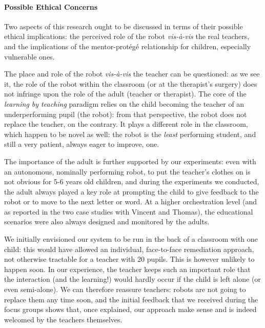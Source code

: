 \documentclass{article}
\begin{document}
\paragraph{Possible Ethical Concerns} Two aspects of this research ought to be
discussed in terms of their possible ethical implications: the perceived role of
the robot \textit{vis-à-vis} the real teachers, and the implications of the
mentor-protégé relationship for children, especially vulnerable ones.

The place and role of the robot \textit{vis-à-vis} the teacher can be
questioned: as we see it, the role of the robot within the classroom (or at the
therapist's surgery) does not infringe upon the role of the adult (teacher or
therapist). The core of the \emph{learning by teaching} paradigm relies on the
child becoming the teacher of an underperforming pupil (the robot): from that
perspective, the robot does not replace the teacher, on the contrary. It plays a
different role in the classroom, which happen to be novel as well: the robot is
the \emph{least} performing student, and still a very patient, always eager to
improve, one.

The importance of the adult is further supported by our experiments: even with
an autonomous, nominally performing robot, to put the teacher's clothes on is
not obvious for 5-6 years old children, and during the experiments we conducted,
the adult always played a key role at prompting the child to give feedback to
the robot or to move to the next letter or word.  At a higher orchestration
level (and as reported in the two case studies with Vincent and Thomas), the
educational scenarios were also always designed and monitored by the adults.

We initially envisioned our system to be run in the back of a classroom with one
child: this would have allowed an individual, face-to-face remediation approach,
not otherwise tractable for a teacher with 20 pupils.  This is however unlikely
to happen soon. In our experience, the teacher keeps such an important role that
the interaction (and the learning!) would hardly occur if the child is left
alone (or even semi-alone). We can therefore reassure teachers: robots are not
going to replace them any time soon, and the initial feedback that we received
during the focus groups shows that, once explained, our approach make sense and
is indeed welcomed by the teachers themselves.
\end{document}
